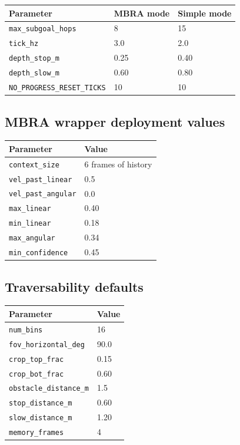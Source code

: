 \documentclass[11pt]{article}
\begin{document}
\begin{center}
\begin{tabular}{lll}
\toprule
\textbf{Parameter} & \textbf{MBRA mode} & \textbf{Simple mode} \\
\midrule
\texttt{max\_subgoal\_hops} & 8 & 15 \\
\texttt{tick\_hz} & 3.0 & 2.0 \\
\texttt{depth\_stop\_m} & 0.25 & 0.40 \\
\texttt{depth\_slow\_m} & 0.60 & 0.80 \\
\texttt{NO\_PROGRESS\_RESET\_TICKS} & 10 & 10 \\
\bottomrule
\end{tabular}
\end{center}

\subsection{MBRA wrapper deployment values}

\begin{center}
\begin{tabular}{ll}
\toprule
\textbf{Parameter} & \textbf{Value} \\
\midrule
\texttt{context\_size} & 6 frames of history \\
\texttt{vel\_past\_linear} & 0.5 \\
\texttt{vel\_past\_angular} & 0.0 \\
\texttt{max\_linear} & 0.40 \\
\texttt{min\_linear} & 0.18 \\
\texttt{max\_angular} & 0.34 \\
\texttt{min\_confidence} & 0.45 \\
\bottomrule
\end{tabular}
\end{center}

\subsection{Traversability defaults}

\begin{center}
\begin{tabular}{ll}
\toprule
\textbf{Parameter} & \textbf{Value} \\
\midrule
\texttt{num\_bins} & 16 \\
\texttt{fov\_horizontal\_deg} & 90.0 \\
\texttt{crop\_top\_frac} & 0.15 \\
\texttt{crop\_bot\_frac} & 0.60 \\
\texttt{obstacle\_distance\_m} & 1.5 \\
\texttt{stop\_distance\_m} & 0.60 \\
\texttt{slow\_distance\_m} & 1.20 \\
\texttt{memory\_frames} & 4 \\
\bottomrule
\end{tabular}
\end{center}
\end{document}
